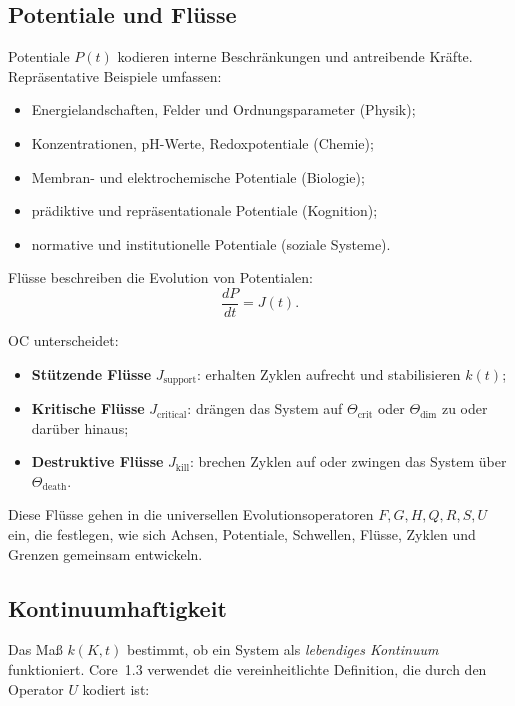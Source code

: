 \subsection{Potentiale und Flüsse}

Potentiale \(P(t)\) kodieren interne Beschränkungen und antreibende Kräfte.  
Repräsentative Beispiele umfassen:

\begin{itemize}
    \item Energielandschaften, Felder und Ordnungsparameter (Physik);
    \item Konzentrationen, pH-Werte, Redoxpotentiale (Chemie);
    \item Membran- und elektrochemische Potentiale (Biologie);
    \item prädiktive und repräsentationale Potentiale (Kognition);
    \item normative und institutionelle Potentiale (soziale Systeme).
\end{itemize}

Flüsse beschreiben die Evolution von Potentialen:
\[
\frac{dP}{dt} = J(t).
\]

OC unterscheidet:

\begin{itemize}
    \item \textbf{Stützende Flüsse} \(J_{\mathrm{support}}\): erhalten Zyklen aufrecht und stabilisieren \(k(t)\);
    \item \textbf{Kritische Flüsse} \(J_{\mathrm{critical}}\): drängen das System auf \(\Theta_{\mathrm{crit}}\) oder \(\Theta_{\mathrm{dim}}\) zu oder darüber hinaus;
    \item \textbf{Destruktive Flüsse} \(J_{\mathrm{kill}}\): brechen Zyklen auf oder zwingen das System über \(\Theta_{\mathrm{death}}\).
\end{itemize}

Diese Flüsse gehen in die universellen Evolutionsoperatoren \(F, G, H, Q, R, S, U\) ein, die festlegen, wie sich Achsen, Potentiale, Schwellen, Flüsse, Zyklen und Grenzen gemeinsam entwickeln.

\subsection{Kontinuumhaftigkeit}

Das Maß \(k(K,t)\) bestimmt, ob ein System als \emph{lebendiges Kontinuum} funktioniert.  
Core~1.3 verwendet die vereinheitlichte Definition, die durch den Operator \(U\) kodiert ist:

